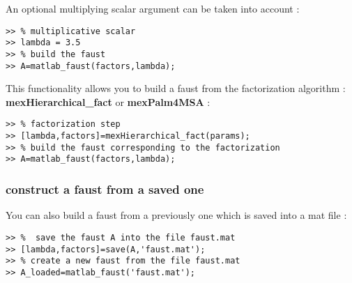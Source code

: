 An optional multiplying scalar argument can be taken into account  :
\begin{lstlisting}
>> % multiplicative scalar
>> lambda = 3.5 
>> % build the faust
>> A=matlab_faust(factors,lambda);
\end{lstlisting}

This functionality allows you to build a faust from the factorization algorithm :
\textbf{mexHierarchical{\_}fact} or \textbf{mexPalm4MSA} :
\begin{lstlisting}
>> % factorization step
>> [lambda,factors]=mexHierarchical_fact(params);
>> % build the faust corresponding to the factorization
>> A=matlab_faust(factors,lambda);
\end{lstlisting}

\subsubsection{construct a faust from a saved one}\label{sec:firstUseBuildFromSave}

You can also build a faust from a previously one which is saved into a mat file :
\begin{lstlisting}
>> %  save the faust A into the file faust.mat
>> [lambda,factors]=save(A,'faust.mat');
>> % create a new faust from the file faust.mat
>> A_loaded=matlab_faust('faust.mat');
\end{lstlisting}
 